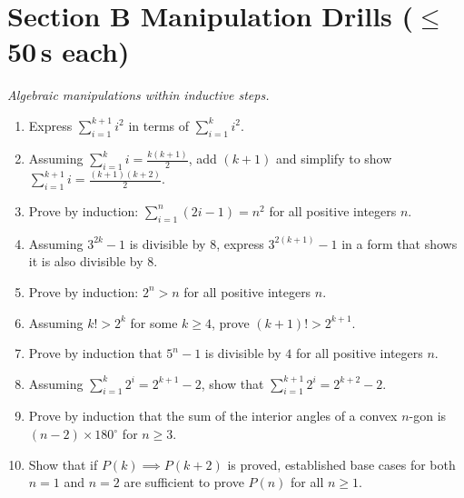 \documentclass[11pt,a4paper]{article}
\begin{document}
\section*{Section B \quad Manipulation Drills \hfill{\normalfont\small($\leq$50\,s each)}}

\noindent\textit{Algebraic manipulations within inductive steps.}

\begin{enumerate}

\item Express $\sum_{i=1}^{k+1} i^2$ in terms of $\sum_{i=1}^k i^2$.

\item Assuming $\sum_{i=1}^k i = \frac{k(k+1)}{2}$, add $(k+1)$ and simplify to show $\sum_{i=1}^{k+1} i = \frac{(k+1)(k+2)}{2}$.

\item Prove by induction: $\sum_{i=1}^n (2i-1) = n^2$ for all positive integers $n$.

\item Assuming $3^{2k} - 1$ is divisible by $8$, express $3^{2(k+1)} - 1$ in a form that shows it is also divisible by $8$.

\item Prove by induction: $2^n > n$ for all positive integers $n$.

\item Assuming $k! > 2^k$ for some $k \ge 4$, prove $(k+1)! > 2^{k+1}$.

\item Prove by induction that $5^n - 1$ is divisible by $4$ for all positive integers $n$.

\item Assuming $\sum_{i=1}^k 2^i = 2^{k+1} - 2$, show that $\sum_{i=1}^{k+1} 2^i = 2^{k+2} - 2$.

\item Prove by induction that the sum of the interior angles of a convex $n$-gon is $(n-2) \times 180^\circ$ for $n \ge 3$.

\item Show that if $P(k) \implies P(k+2)$ is proved, established base cases for both $n=1$ and $n=2$ are sufficient to prove $P(n)$ for all $n \ge 1$.

\end{enumerate}

\end{document}
